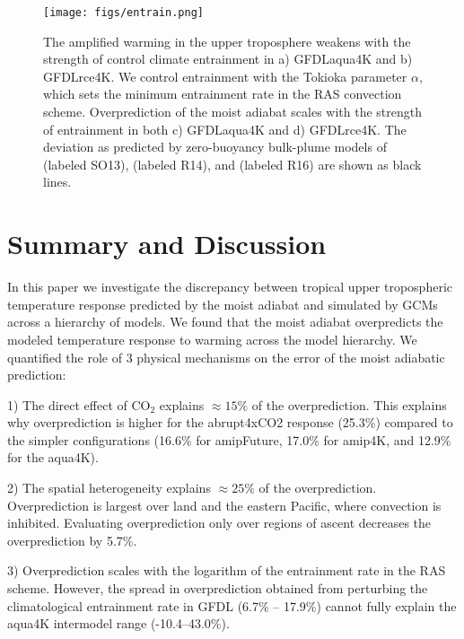 \documentclass[draft]{agujournal2019}
\begin{document}
\begin{figure}
\centering
\texttt{[image: figs/entrain.png]}
\caption{The amplified warming in the upper troposphere weakens with the strength of control climate entrainment in a) GFDLaqua4K and b) GFDLrce4K. We control entrainment with the Tokioka parameter $\alpha$, which sets the minimum entrainment rate in the RAS convection scheme. Overprediction of the moist adiabat scales with the strength of entrainment in both c) GFDLaqua4K and d) GFDLrce4K. The deviation as predicted by zero-buoyancy bulk-plume models of  (labeled SO13),  (labeled R14), and  (labeled R16) are shown as black lines.}
\label{fig:entrain}
\end{figure}

\section{Summary and Discussion}
In this paper we investigate the discrepancy between tropical upper tropospheric temperature response predicted by the moist adiabat and simulated by GCMs across a hierarchy of models. We found that the moist adiabat overpredicts the modeled temperature response to warming across the model hierarchy. We quantified the role of 3 physical mechanisms on the error of the moist adiabatic prediction:

1) The direct effect of CO$_2$ explains $\approx15\%$ of the overprediction. This explains why overprediction is higher for the abrupt4xCO2 response (25.3\%) compared to the simpler configurations (16.6\% for amipFuture, 17.0\% for amip4K, and 12.9\% for the aqua4K). 

2) The spatial heterogeneity explains $\approx25\%$ of the overprediction. Overprediction is largest over land and the eastern Pacific, where convection is inhibited. Evaluating overprediction only over regions of ascent decreases the overprediction by 5.7\%. 

3) Overprediction scales with the logarithm of the entrainment rate in the RAS scheme. However, the spread in overprediction obtained from perturbing the climatological entrainment rate in GFDL (6.7\% -- 17.9\%) cannot fully explain the aqua4K intermodel range (-10.4--43.0\%). 
\end{document}
